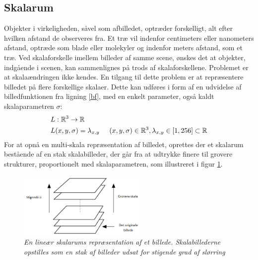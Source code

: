 \subsection{Skalarum}
\label{sec:scale}
Objekter i virkeligheden, såvel som afbilledet, optræder forskelligt, alt efter hvilken afstand de observeres fra. Et træ vil indenfor centimeters eller nanometers afstand, optræde som blade eller molekyler og indenfor meters afstand, som et træ. Ved skalaforskelle imellem billeder af samme scene, ønskes det at objekter, indgående i scenen, kan sammenlignes på trods af skalaforskellene. Problemet er at skalaændringen ikke kendes. En tilgang til dette problem er at repræsentere billedet på flere forskellige skalaer. Dette kan udføres i form af en udvidelse af billedfunktionen fra ligning \eqref{bf}, med en enkelt parameter, også kaldt skalaparametren $\sigma$:
\begin{equation}
\begin{split}
&L: \mathbb{R}^3 \rightarrow \mathbb{R} \\
&L(x,y,\sigma) = \lambda_{x,y} \hspace{0.5 cm} (x,y,\sigma)\in \mathbb{R}^3, \lambda_{x,y} \in [1,256] \subset \mathbb{R}
\end{split}
\end{equation}
For at opnå en multi-skala repræsentation af billedet, oprettes der et skalarum bestående af en stak skalabilleder, der går fra at udtrykke finere til grovere strukturer, proportionelt med skalaparametren, som illustreret i figur \ref{fig:scalerep}. 
\begin{figure}[H]
    \centering
    \includegraphics[width=0.55\textwidth]{fig/32.png}
     \vspace{-0.5em}
    \begin{center}    
       \caption{{\footnotesize \textit{En lineær skalarums repræsentation af et billede. Skalabillederne opstilles som en stak af billeder udsat for stigende grad af slørring}}}
    \label{fig:scalerep}
     \end{center}
     \vspace{-2.5em}
  \end{figure} \noindent
